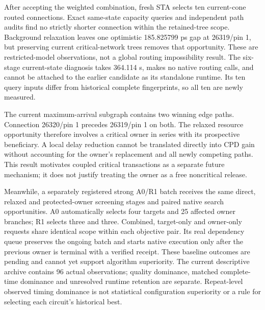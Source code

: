 After accepting the weighted combination, fresh STA selects ten current-cone routed connections. Exact same-state capacity queries and independent path audits find no strictly shorter connection within the retained-tree scope. Background relaxation leaves one optimistic 185.825799 ps gap at 26319/pin 1, but preserving current critical-network trees removes that opportunity. These are restricted-model observations, not a global routing impossibility result. The six-stage current-state diagnosis takes 364.114 s, makes no native routing calls, and cannot be attached to the earlier candidate as its standalone runtime. Its ten query inputs differ from historical complete fingerprints, so all ten are newly measured.

The current maximum-arrival subgraph contains two winning edge paths. Connection 26320/pin 1 precedes 26319/pin 1 on both. The relaxed resource opportunity therefore involves a critical owner in series with its prospective beneficiary. A local delay reduction cannot be translated directly into CPD gain without accounting for the owner's replacement and all newly competing paths. This result motivates coupled critical transactions as a separate future mechanism; it does not justify treating the owner as a free noncritical release.

Meanwhile, a separately registered strong A0/R1 batch receives the same direct, relaxed and protected-owner screening stages and paired native search opportunities. A0 automatically selects four targets and 25 affected owner branches; R1 selects three and three. Combined, target-only and owner-only requests share identical scope within each objective pair. Its real dependency queue preserves the ongoing batch and starts native execution only after the previous owner is terminal with a verified receipt. These baseline outcomes are pending and cannot yet support algorithm superiority. The current descriptive archive contains 96 actual observations; quality dominance, matched complete-time dominance and unresolved runtime retention are separate. Repeat-level observed timing dominance is not statistical configuration superiority or a rule for selecting each circuit's historical best.
